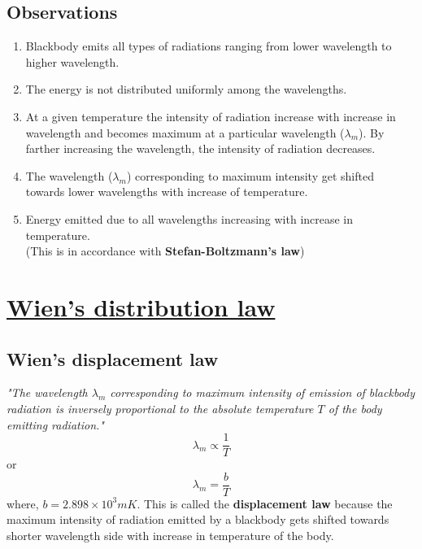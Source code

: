 \documentclass[14pt,a4paper]{article}
\begin{document}
\subsection{\textbf{Observations}}
\begin{enumerate}
    \item Blackbody emits all types of radiations ranging from lower wavelength to higher wavelength.
    \item The energy is not distributed uniformly among the wavelengths.
    \item At a given temperature the intensity of radiation increase with increase in wavelength and becomes maximum at a particular wavelength ($\lambda_{m}$). By farther increasing the wavelength, the intensity of radiation decreases.
    \item The wavelength ($\lambda_{m}$) corresponding to maximum intensity get shifted towards lower wavelengths with increase of temperature.
    \item Energy emitted due to all wavelengths increasing with increase in temperature.\\
    (This is in accordance with \textbf{Stefan-Boltzmann's law})
\end{enumerate}
\newpage
\section{\underline{Wien's distribution law}}
    \subsection{\textbf{Wien's displacement law}} \textit{"The wavelength $\lambda_{m}$ corresponding to maximum intensity of emission of blackbody radiation is inversely proportional to the absolute temperature $T$ of the body emitting radiation."}
    \begin{equation*}
        \lambda_{m} \propto \frac{1}{T}
    \end{equation*}
    or
    \begin{equation}
        \lambda_{m} = \frac{b}{T}
    \end{equation}
    where,  $b = 2.898 \times 10^{3} mK$.
This is called the \textbf{displacement law} because the maximum intensity of radiation emitted by a blackbody gets shifted towards shorter wavelength side with increase in temperature of the body.
\end{document}
